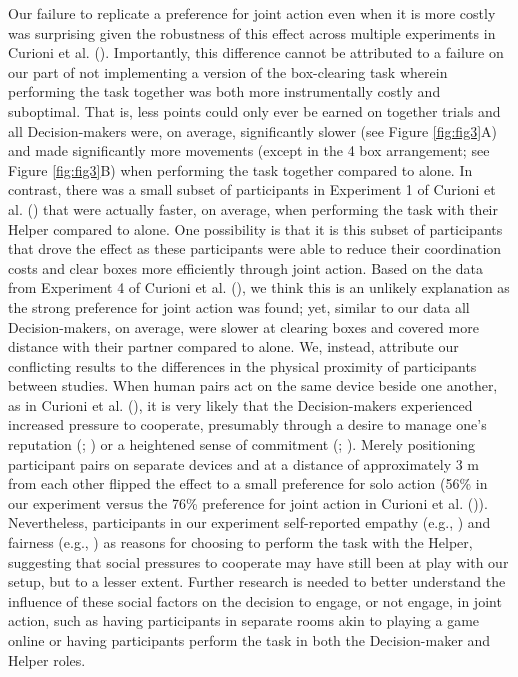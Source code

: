 \documentclass[
  man,
  floatsintext,
  longtable,
  nolmodern,
  notxfonts,
  notimes,
  colorlinks=true,linkcolor=blue,citecolor=blue,urlcolor=blue]{apa7}
\begin{document}
Our failure to replicate a preference for joint action even when it is
more costly was surprising given the robustness of this effect across
multiple experiments in Curioni et al.
(). Importantly, this difference cannot
be attributed to a failure on our part of not implementing a version of
the box-clearing task wherein performing the task together was both more
instrumentally costly and suboptimal. That is, less points could only
ever be earned on together trials and all Decision-makers were, on
average, significantly slower (see Figure \ref{fig:fig3}A) and made
significantly more movements (except in the 4 box arrangement; see
Figure \ref{fig:fig3}B) when performing the task together compared to
alone. In contrast, there was a small subset of participants in
Experiment 1 of Curioni et al. () that
were actually faster, on average, when performing the task with their
Helper compared to alone. One possibility is that it is this subset of
participants that drove the effect as these participants were able to
reduce their coordination costs and clear boxes more efficiently through
joint action. Based on the data from Experiment 4 of Curioni et al.
(), we think this is an unlikely
explanation as the strong preference for joint action was found; yet,
similar to our data all Decision-makers, on average, were slower at
clearing boxes and covered more distance with their partner compared to
alone. We, instead, attribute our conflicting results to the differences
in the physical proximity of participants between studies. When human
pairs act on the same device beside one another, as in Curioni et al.
(), it is very likely that the
Decision-makers experienced increased pressure to cooperate, presumably
through a desire to manage one's reputation
(;
) or a heightened sense of
commitment (;
). Merely positioning
participant pairs on separate devices and at a distance of approximately
3 m from each other flipped the effect to a small preference for solo
action (56\% in our experiment versus the 76\% preference for joint
action in Curioni et al. ()).
Nevertheless, participants in our experiment self-reported empathy
(e.g., ) and fairness
(e.g., ) as reasons
for choosing to perform the task with the Helper, suggesting that social
pressures to cooperate may have still been at play with our setup, but
to a lesser extent. Further research is needed to better understand the
influence of these social factors on the decision to engage, or not
engage, in joint action, such as having participants in separate rooms
akin to playing a game online or having participants perform the task in
both the Decision-maker and Helper roles.
\end{document}
